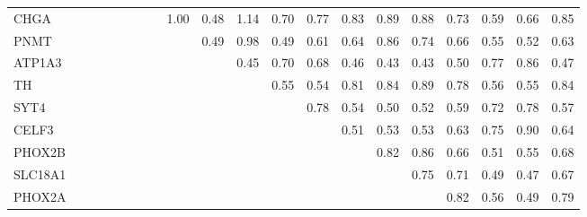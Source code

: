 \begin{longtable}{lrrrrrrrrrrrrrrrrrrr}
CHGA    &             &              &             &            &             &           &            &       1.00 &         0.48 &     1.14 &       0.70 &        0.77 &         0.83 &          0.89 &         0.88 &      0.73 &          0.59 &        0.66 &           0.85 \\
PNMT    &             &              &             &            &             &           &            &            &         0.49 &     0.98 &       0.49 &        0.61 &         0.64 &          0.86 &         0.74 &      0.66 &          0.55 &        0.52 &           0.63 \\
ATP1A3  &             &              &             &            &             &           &            &            &              &     0.45 &       0.70 &        0.68 &         0.46 &          0.43 &         0.43 &      0.50 &          0.77 &        0.86 &           0.47 \\
TH      &             &              &             &            &             &           &            &            &              &          &       0.55 &        0.54 &         0.81 &          0.84 &         0.89 &      0.78 &          0.56 &        0.55 &           0.84 \\
SYT4    &             &              &             &            &             &           &            &            &              &          &            &        0.78 &         0.54 &          0.50 &         0.52 &      0.59 &          0.72 &        0.78 &           0.57 \\
CELF3   &             &              &             &            &             &           &            &            &              &          &            &             &         0.51 &          0.53 &         0.53 &      0.63 &          0.75 &        0.90 &           0.64 \\
PHOX2B  &             &              &             &            &             &           &            &            &              &          &            &             &              &          0.82 &         0.86 &      0.66 &          0.51 &        0.55 &           0.68 \\
SLC18A1 &             &              &             &            &             &           &            &            &              &          &            &             &              &               &         0.75 &      0.71 &          0.49 &        0.47 &           0.67 \\
PHOX2A  &             &              &             &            &             &           &            &            &              &          &            &             &              &               &              &      0.82 &          0.56 &        0.49 &           0.79 \\

\end{longtable}

